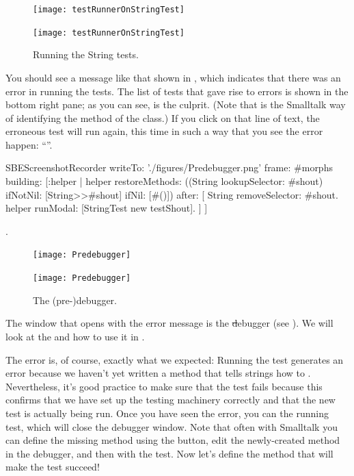 \documentclass[a4paper,10pt,twoside]{book}
\begin{document}
\begin{figure}[hbt]
\ifluluelse
	{\centerline {\texttt{[image: testRunnerOnStringTest]}}}
	{\centerline {\texttt{[image: testRunnerOnStringTest]}}}
\caption{Running the String tests.
\label{fig:testRunnerTestShout}}
\end{figure}

You should see a message like that shown in , which indicates that there was an error in running the tests.
The list of tests that gave rise to errors is shown in the bottom right pane; as you can see,  is the culprit.
(Note that  is the Smalltalk way of identifying the  method of the  class.)
If you click on that line of text, the erroneous test will run again, this time in such a way that you see the error happen: ``''.

\begin{ExecuteSmalltalkScript}
SBEScreenshotRecorder writeTo: './figures/Predebugger.png' frame: #morphs building: [:helper |
		helper restoreMethods: ((String lookupSelector: #shout) ifNotNil: [{String>>#shout}] ifNil: [#()]) after: [
			String removeSelector: #shout.
			helper runModal: [StringTest new testShout].
		]
]
\end{ExecuteSmalltalkScript}.
\begin{figure}[hbt]
	\ifluluelse
		{\centerline {\texttt{[image: Predebugger]}}}
		{\centerline {\texttt{[image: Predebugger]}}}
	\caption{The (pre-)debugger.}
	\label{fig:predebugger}
\end{figure}

The window that opens with the error message is the \st debugger (see ).
We will look at the  and how to use it in .

The error is, of course, exactly what we expected:
Running the test generates an error because we haven't yet written a method that tells strings how to .
Nevertheless, it's good practice to make sure that the test fails because this confirms that we have set up the testing machinery correctly and that the new test is actually being run.
Once you have seen the error, you can  the running test, which will close the debugger window.
Note that often with Smalltalk you can define the missing method using the  button, edit the newly-created method in the debugger, and then  with the test.
Now let's define the method that will make the test succeed!
\end{document}
